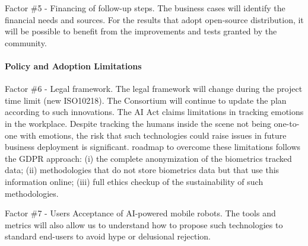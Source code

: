Factor \#5 - Financing of follow-up steps. The business cases will
identify the financial needs and sources. For the results that adopt
open-source distribution, it will be possible to benefit from the
improvements and tests granted by the community.

\paragraph{Policy and Adoption
Limitations}\label{policy-and-adoption-limitations}

Factor \#6 - Legal framework. The legal framework will change during the
project time limit (new ISO10218). The Consortium will continue to
update the plan according to such innovations. The AI Act claims
limitations in tracking emotions in the workplace. Despite tracking the
humans inside the scene not being one-to-one with emotions, the risk
that such technologies could raise issues in future business deployment
is significant.  roadmap to overcome
these limitations follows the GDPR approach: (i) the complete
anonymization of the biometrics tracked data; (ii) methodologies that do
not store biometrics data but that use this information online; (iii)
full ethics checkup of the sustainability of such methodologies.

Factor \#7 - Users\textquotesingle{} Acceptance of AI-powered mobile
robots. The tools and metrics will also allow us to understand how to
propose such technologies to standard end-users to avoid hype or
delusional rejection.